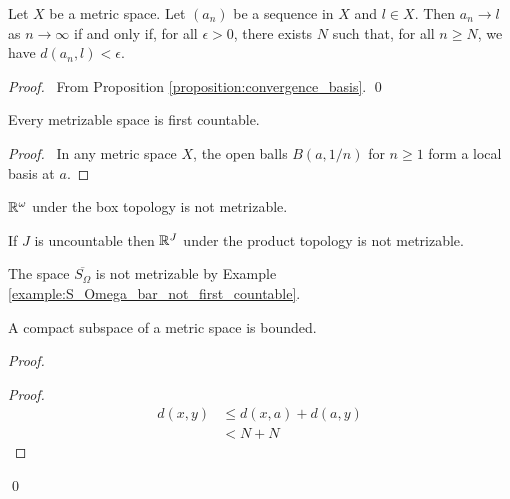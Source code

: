 \begin{proposition}
    \label{proposition:convergence_metric}
    Let $X$ be a metric space. Let $(a_n)$ be a sequence in $X$ and $l \in X$.
    Then $a_n \rightarrow l$ as $n \rightarrow \infty$ if and only if,
    for all $\epsilon > 0$, there exists $N$ such that, for all $n \geq N$,
    we have $d(a_n, l) < \epsilon$.
\end{proposition}

\begin{proof}
    \pf\ From Proposition \ref{proposition:convergence_basis}. \qed
\end{proof}

\begin{proposition}
    Every metrizable space is first countable.
\end{proposition}

\begin{proof}
    \pf\ In any metric space $X$, the open balls $B(a,1/n)$ for $n \geq 1$ form a local basis at $a$.
\end{proof}

\begin{example}
    $\mathbb{R}^\omega$ under the box topology is not metrizable.
\end{example}

\begin{example}
    If $J$ is uncountable then $\mathbb{R}^J$ under the product topology is not metrizable.
\end{example}

\begin{example}
    The space $\overline{S_\Omega}$ is not metrizable by Example \ref{example:S_Omega_bar_not_first_countable}.
\end{example}

\begin{proposition}
    \label{proposition:bounded_compact}
    A compact subspace of a metric space is bounded.
\end{proposition}

\begin{proof}
    \pf
    \begin{proof}
        \pf
        \begin{align*}
            d(x,y) & \leq d(x,a) + d(a,y) \\
            & < N + N
        \end{align*}
    \end{proof}
    \qed
\end{proof}

